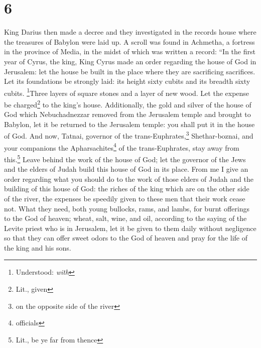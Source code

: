 \section{6}
\begin{enumerate}[align=center]
     King Darius then made a decree and they investigated in the records house where the treasures of Babylon were laid up.%
     A scroll was found in Achmetha, a fortress in the province of Media, in the midst of which was written a record:%
     ``In the first year of Cyrus, the king, King Cyrus made an order regarding the house of God in Jerusalem: let the house be built in the place where they are sacrificing sacrifices. Let its foundations be strongly laid: its height sixty cubits and its breadth sixty cubits.%
     \footnote{Understood: \textit{with}}Three layers of square stones and a layer of new wood. Let the expense be charged\footnote{Lit., given} to the king's house.%
     Additionally, the gold and silver of the house of God which Nebuchadnezzar removed from the Jerusalem temple and brought to Babylon, let it be returned to the Jerusalem temple: you shall put it in the house of God.%
     And now, Tatnai, governor of the trans-Euphrates,\footnote{on the opposite side of the river} Shethar-boznai, and your companions the Apharsachites\footnote{officials} of the trans-Euphrates, stay away from this.\footnote{Lit., be ye far from thence}%
     Leave behind the work of the house of God; let the governor of the Jews and the elders of Judah build this house of God in its place.%
     From me I give an order regarding what you should do to the work of those elders of Judah and the building of this house of God: the riches of the king which are on the other side of the river, the expenses be speedily given to these men that their work cease not.%
     What they need, both young bullocks, rams, and lambs, for burnt offerings to the God of heaven; wheat, salt, wine, and oil, according to the saying of the Levite priest who is in Jerusalem, let it be given to them daily without negligence%
     so that they can offer sweet odors to the God of heaven and pray for the life of the king and his sons.%

\end{enumerate}
